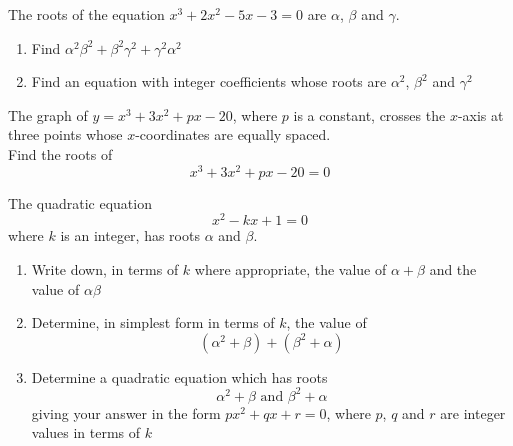 \documentclass[leqno]{article}
\begin{document}
\begin{enumerate}[
  label=\textbf{\arabic*.},
  leftmargin=*,
  topsep=0pt,
  partopsep=0pt,
  parsep=0pt
]
\newpage

\questionitem

The roots of the equation $x^3 + 2x^2 - 5x - 3 = 0$ are $\alpha$, $\beta$ and $\gamma$. \\

\begin{enumerate}[label=\textbf{(\alph*)}]
  \item Find $\alpha^2\beta^2 + \beta^2\gamma^2 + \gamma^2\alpha^2$  \\
  \item Find an equation with integer coefficients whose roots are $\alpha^2$, $\beta^2$ and $\gamma^2$  \\
\end{enumerate}

\newpage

\questionitem

The graph of $y=x^3+3x^2+px-20$, where $p$ is a constant, crosses the $x$-axis at three points whose $x$-coordinates are equally spaced. \\

Find the roots of
\[
x^3+3x^2+px-20=0
\] 

\newpage

\questionitem

The quadratic equation
\[
x^2 - kx + 1 = 0
\]
where $k$ is an integer, has roots $\alpha$ and $\beta$. \\

\begin{enumerate}[label=\textbf{(\alph*)}]
  \item Write down, in terms of $k$ where appropriate, the value of $\alpha + \beta$ and the value of $\alpha\beta$  \\
  \item Determine, in simplest form in terms of $k$, the value of
  \[
  (\alpha^2 + \beta) + (\beta^2 + \alpha)
  \]
  \item Determine a quadratic equation which has roots
  \[
  \alpha^2 + \beta \text{ and } \beta^2 + \alpha
  \]
  giving your answer in the form $px^2 + qx + r = 0$, where $p$, $q$ and $r$ are integer values in terms of $k$  \\
\end{enumerate}


\end{enumerate}
\end{document}
